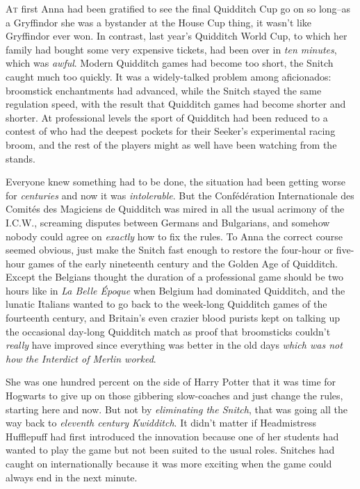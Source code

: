 
\lettrine{A}{t} first Anna had been gratified to see the final Quidditch Cup go on so long\---as a Gryffindor she was a bystander at the House Cup thing, it wasn't like Gryffindor ever won. In contrast, last year's Quidditch World Cup, to which her family had bought some very expensive tickets, had been over in \emph{ten minutes}, which was \emph{awful}. Modern Quidditch games had become too short, the Snitch caught much too quickly. It was a widely-talked problem among aficionados: broomstick enchantments had advanced, while the Snitch stayed the same regulation speed, with the result that Quidditch games had become shorter and shorter. At professional levels the sport of Quidditch had been reduced to a contest of who had the deepest pockets for their Seeker's experimental racing broom, and the rest of the players might as well have been watching from the stands.

Everyone knew something had to be done, the situation had been getting worse for \emph{centuries} and now it was \emph{intolerable}. But the Confédération Internationale des Comités des Magiciens de Quidditch was mired in all the usual acrimony of the I.C.W., screaming disputes between Germans and Bulgarians, and somehow nobody could agree on \emph{exactly} how to fix the rules. To Anna the correct course seemed obvious, just make the Snitch fast enough to restore the four-hour or five-hour games of the early nineteenth century and the Golden Age of Quidditch. Except the Belgians thought the duration of a professional game should be two hours like in \emph{La Belle Époque} when Belgium had dominated Quidditch, and the lunatic Italians wanted to go back to the week-long Quidditch games of the fourteenth century, and Britain's even crazier blood purists kept on talking up the occasional day-long Quidditch match as proof that broomsticks couldn't \emph{really} have improved since everything was better in the old days \emph{which was not how the Interdict of Merlin worked}.

She was one hundred percent on the side of Harry Potter that it was time for Hogwarts to give up on those gibbering slow-coaches and just change the rules, starting here and now. But not by \emph{eliminating the Snitch}, that was going all the way back to \emph{eleventh century Kwidditch}. It didn't matter if Headmistress Hufflepuff had first introduced the innovation because one of her students had wanted to play the game but not been suited to the usual roles. Snitches had caught on internationally because it was more exciting when the game could always end in the next minute.

